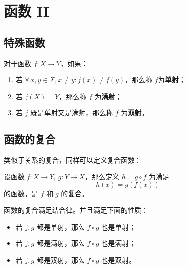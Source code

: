 \section{函数 II}

\subsection{特殊函数}

\begin{definition}[单射、满射、双射]
    对于函数 $f: X \to Y$，如果：

    \begin{enumerate}
        \item[\textbf{1)}] 若 $\forall\,x, y \in X, x \neq y: f(x) \neq f(y)$，那么称 $f$为\textbf{单射}；
        \item[\textbf{2)}] 若 $f(X) = Y$，那么称 $f$ 为\textbf{满射}；
        \item[\textbf{3)}] 若 $f$ 既是单射又是满射，那么称 $f$ 为\textbf{双射}。
    \end{enumerate}
\end{definition}

\subsection{函数的复合}

类似于关系的复合，同样可以定义复合函数：

\begin{definition}[函数的复合]
    设函数 $f: X \to Y,\ g: Y \to X$，那么定义 $h = g \circ f$ 为满足
    $$
    h(x) = g(f(x))
    $$
    的函数，是 $f$ 和 $g$ 的\textbf{复合}。
\end{definition}

函数的复合满足结合律。并且满足下面的性质：

\begin{itemize}
    \item 若 $f, g$ 都是单射，那么 $f \circ g$ 也是单射；
    \item 若 $f, g$ 都是满射，那么 $f \circ g$ 也是满射；
    \item 若 $f, g$ 都是双射，那么 $f \circ g$ 也是双射。
\end{itemize}
